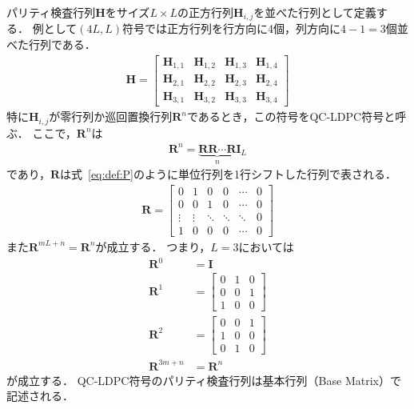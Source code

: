 \documentclass[twocolumn, a4paper]{ieicejsp}
\begin{document}
パリティ検査行列$\mathbf{H}$をサイズ$L \times L$の正方行列$\mathbf{H}_{i,j}$を並べた行列として定義する．
例として$(4L,L)$符号では正方行列を行方向に4個，列方向に$4-1=3$個並べた行列である．
\begin{align}
  \mathbf{H} = \begin{bmatrix}
    \mathbf{H}_{1,1} & \mathbf{H}_{1,2} & \mathbf{H}_{1,3} &  \mathbf{H}_{1,4} \\
    \mathbf{H}_{2,1} & \mathbf{H}_{2,2} & \mathbf{H}_{2,3} &  \mathbf{H}_{2,4} \\
    \mathbf{H}_{3,1} & \mathbf{H}_{3,2} & \mathbf{H}_{3,3} &  \mathbf{H}_{3,4}
  \end{bmatrix}
\end{align}
特に$\mathbf{H}_{i,j}$が零行列か巡回置換行列$\mathbf{R}^{n}$であるとき，この符号をQC-LDPC符号と呼ぶ．
ここで，$\mathbf{R}^n$は
\begin{align}
  \mathbf{R}^n = \underbrace{\mathbf{R} \mathbf{R} \cdots \mathbf{R}}_{n} \mathbf{I}_{L}
\end{align}
であり，$\mathbf{R}$は式~\eqref{eq:def:P}のように単位行列を1行シフトした行列で表される．
\begin{align}
  \mathbf{R} = \begin{bmatrix}
    0 & 1 & 0 & 0 & \cdots & 0 \\
    0 & 0 & 1 & 0 & \cdots & 0 \\
    \vdots & \vdots & \ddots & \ddots & \ddots & 0 \\
    1 & 0 & 0 & 0 & \cdots & 0
  \end{bmatrix} \label{eq:def:P}
\end{align}
また$\mathbf{R}^{mL+n}=\mathbf{R}^{n}$が成立する．
つまり，$L=3$においては
\begin{align}
  \mathbf{R}^0 &= \mathbf{I} \\
  \mathbf{R}^1 &= \begin{bmatrix}
    0 & 1 & 0 \\
    0 & 0 & 1 \\
    1 & 0 & 0
  \end{bmatrix} \\
  \mathbf{R}^2 &= \begin{bmatrix}
    0 & 0 & 1 \\
    1 & 0 & 0 \\
    0 & 1 & 0
  \end{bmatrix} \\
  \mathbf{R}^{3m+n} &= \mathbf{R}^n
\end{align}
が成立する．
QC-LDPC符号のパリティ検査行列は基本行列（Base Matrix）で記述される．
\end{document}
